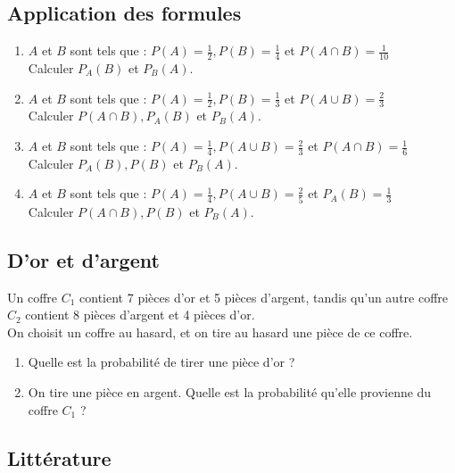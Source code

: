 \documentclass[oneside,12pt]{book}          %
\begin{document}
\subsection{Application des formules}
\begin{enumerate}
    \item $A$ et $B$ sont tels que : $P(A)=\frac{1}{2},P(B)=\frac{1}{4}$ et $P(A\cap B)=\frac{1}{10}$ \\
    Calculer $P_{A}(B)$ et $P_{B}(A)$.
    \item $A$ et $B$ sont tels que : $P(A)=\frac{1}{2},P(B)=\frac{1}{3}$ et $P(A\cup B)=\frac{2}{3}$ \\
    Calculer $P(A\cap B),P_{A}(B)$ et $P_{B}(A)$.

    \item $A$ et $B$ sont tels que : $P(A)=\frac{1}{4},P(A\cup B)=\frac{2}{3}$ et $P(A\cap B)=\frac{1}{6}$ \\
    Calculer $P_{A}(B),P(B)$ et $P_{B}(A)$.
    \item $A$ et $B$ sont tels que : $P(A)=\frac{1}{4},P(A\cup B)=\frac{2}{5}$ et $P_{A}(B)=\frac{1}{3}$ \\
    Calculer $P(A\cap B), P(B) $ et $P_{B}(A)$.
\end{enumerate}


\subsection{D'or et d'argent}
 Un coffre $C_{1}$ contient 7 pièces d'or et 5 pièces d'argent, tandis qu'un autre coffre $C_{2}$ contient 8 pièces d'argent et 4 pièces d'or. \\
On choisit un coffre au hasard, et on tire au hasard une pièce de ce coffre. 
\begin{enumerate}
    \item Quelle est la probabilité de tirer une pièce d'or ?
    \item On tire une pièce en argent. Quelle est la probabilité qu'elle provienne du coffre $C_{1}$ ?
\end{enumerate}



\subsection{Littérature}
\end{document}

